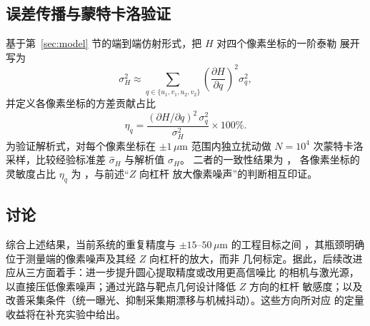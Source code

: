 \subsection{误差传播与蒙特卡洛验证}

基于第~\ref{sec:model} 节的端到端仿射形式，把 $H$ 对四个像素坐标的一阶泰勒
展开写为
\begin{equation}
\label{eq:propagation}
\sigma_H^2 \approx \sum_{q\in\{u_1,v_1,u_2,v_2\}}
\left(\frac{\partial H}{\partial q}\right)^2 \sigma_q^2,
\end{equation}
并定义各像素坐标的方差贡献占比
\begin{equation}
\label{eq:eta}
\eta_q = \frac{(\partial H/\partial q)^2\,\sigma_q^2}{\sigma_H^2}\times 100\%.
\end{equation}
为验证解析式，对每个像素坐标在 $\pm1\,\mu\mathrm{m}$ 范围内独立扰动做
$N=10^4$ 次蒙特卡洛采样，比较经验标准差 $\hat{\sigma}_H$ 与解析值 $\sigma_H$。
二者的一致性结果为 ，
各像素坐标的灵敏度占比 $\eta_q$ 为 ，与前述“$Z$ 向杠杆
放大像素噪声”的判断相互印证。

\subsection{讨论}

综合上述结果，当前系统的重复精度与 $\pm15$--$50\,\mu\mathrm{m}$ 的工程目标之间
，其瓶颈明确位于测量端的像素噪声及其经 $Z$ 向杠杆的放大，而非
几何标定。据此，后续改进应从三方面着手：进一步提升圆心提取精度或改用更高信噪比
的相机与激光源，以直接压低像素噪声；通过光路与靶点几何设计降低 $Z$ 方向的杠杆
敏感度；以及改善采集条件（统一曝光、抑制采集期漂移与机械抖动）。这些方向所对应
的定量收益将在补充实验中给出。
